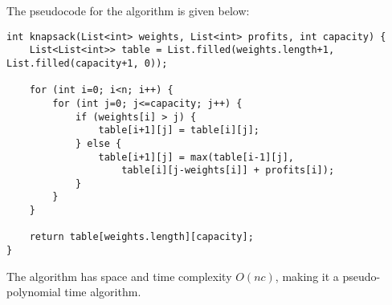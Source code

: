\documentclass[a4paper, openany]{memoir}
\begin{document}
    The pseudocode for the algorithm is given below:
\begin{lstlisting}[language=pseudocode]
int knapsack(List<int> weights, List<int> profits, int capacity) {
    List<List<int>> table = List.filled(weights.length+1, List.filled(capacity+1, 0));

    for (int i=0; i<n; i++) {
        for (int j=0; j<=capacity; j++) {
            if (weights[i] > j) {
                table[i+1][j] = table[i][j];
            } else {
                table[i+1][j] = max(table[i-1][j], 
                    table[i][j-weights[i]] + profits[i]);
            }
        }
    }

    return table[weights.length][capacity];
}
\end{lstlisting}
    The algorithm has space and time complexity $O(nc)$, making it a pseudo-polynomial time algorithm.
\end{document}
